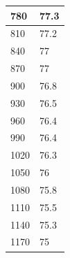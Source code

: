 \documentclass{report}
\begin{document}
{\begin{tabular}{|l|l|}
780           & 77.3                 \\ \hline
810           & 77.2                 \\ \hline
840           & 77                   \\ \hline
870           & 77                   \\ \hline
900           & 76.8                 \\ \hline
930           & 76.5                 \\ \hline
960           & 76.4                 \\ \hline
990           & 76.4                 \\ \hline
1020          & 76.3                 \\ \hline
1050          & 76                   \\ \hline
1080          & 75.8                 \\ \hline
1110          & 75.5                 \\ \hline
1140          & 75.3                 \\ \hline
1170          & 75                   \\ \hline
\end{tabular}
}
\\
\pagebreak
\end{document}
